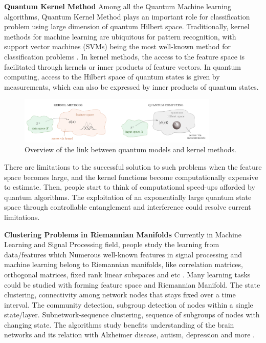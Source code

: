 \documentclass{article}
\begin{document}
\textbf{Quantum Kernel Method} Among all the 
Quantum Machine learning algorithms, Quantum Kernel 
Method plays an important role for classification problem using 
large dimension of quantum Hilbert space. Traditionally, 
kernel methods for machine learning 
are ubiquitous for pattern recognition, 
with support vector machines (SVMs) being the most well-known method 
for classification problems \cite{svm}. 
In kernel methods, the access to the feature space is facilitated 
through kernels or inner products of feature vectors. 
In quantum computing, access to the Hilbert space of quantum states
 is given by measurements, which can also be expressed 
 by inner products of quantum states. \cite{qml_kernel2}
 \begin{figure}[h]
  \begin{center}
    \includegraphics[width=0.85\textwidth]{kernel2.png}    
  \end{center}
  \caption{Overview of the link between quantum models 
  and kernel methods.}
\end{figure}
There are limitations to the successful 
solution to such problems when the feature space becomes large, 
and the kernel functions become computationally expensive to estimate. 
Then, people start to think of computational speed-ups afforded by 
quantum algorithms. The exploitation of an exponentially 
large quantum state space through controllable 
entanglement and interference could resolve current limitations. 

\textbf{Clustering Problems in Riemannian Manifolds}
Currently in Machine Learning and Signal Processing field, 
people study the learning from data/features which 
Numerous well-known features in signal processing 
and machine learning belong to Riemannian manifolds, like 
correlation matrices, orthogonal matrices, fixed rank linear 
subspaces and etc \cite{manifold1}. 
Many learning tasks could be studied with forming feature 
space and Riemannian Manifold. The state clustering, 
connectivity among network nodes that stays fixed over a 
time interval. The community detection, subgroup detection 
of nodes within a single state/layer. Subnetwork-sequence 
clustering, sequence of subgroups of nodes with changing state. 
The algorithms study benefits understanding of the brain networks 
and its relation with Alzheimer disease, autism, depression and more \cite{manifold1}.
\end{document}
